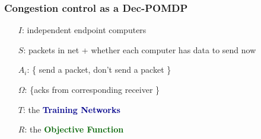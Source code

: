 \begin{frame}
\frametitle{Congestion control as a Dec-POMDP}

\begin{itemize}

\item[$I$:] independent endpoint computers

\pause

\item[$S$:] packets in net + whether each computer has data to send now

\pause

\item[$A_i$:] \{ send a packet, don't send a packet \}

\pause

\item[$\Omega$:] \{acks from corresponding receiver \}

\pause

\item[$T$:] the \textbf{\textcolor{DarkBlue}{Training Networks}}

\pause

\item[$R$:] the \textbf{\textcolor{DarkGreen}{Objective Function}}

\item[]

\pause

\item[] 

\end{itemize}

\end{frame}

